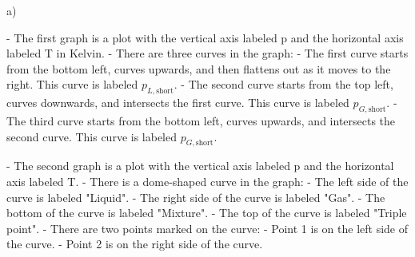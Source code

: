 a)

- The first graph is a plot with the vertical axis labeled p and the horizontal axis labeled T in Kelvin.
- There are three curves in the graph:
  - The first curve starts from the bottom left, curves upwards, and then flattens out as it moves to the right. This curve is labeled \( p_{L, \text{short}} \).
  - The second curve starts from the top left, curves downwards, and intersects the first curve. This curve is labeled \( p_{G, \text{short}} \).
  - The third curve starts from the bottom left, curves upwards, and intersects the second curve. This curve is labeled \( p_{G, \text{short}} \).

- The second graph is a plot with the vertical axis labeled p and the horizontal axis labeled T.
- There is a dome-shaped curve in the graph:
  - The left side of the curve is labeled "Liquid".
  - The right side of the curve is labeled "Gas".
  - The bottom of the curve is labeled "Mixture".
  - The top of the curve is labeled "Triple point".
  - There are two points marked on the curve:
    - Point 1 is on the left side of the curve.
    - Point 2 is on the right side of the curve.